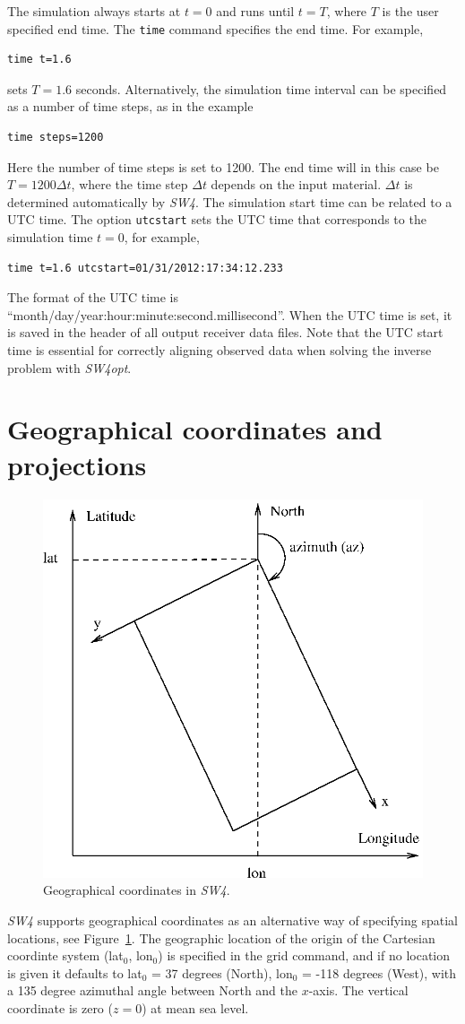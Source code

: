 \documentclass[11pt]{report}
\begin{document}
The simulation always starts at $t=0$ and runs until $t=T$, where $T$ is the user specified end
time.  The {\tt time} command specifies the end time. For example,
\begin{verbatim}
time t=1.6
\end{verbatim}
sets $T=1.6$ seconds. Alternatively, the simulation time interval can be specified as 
a number of time steps, as in the example
\begin{verbatim}
time steps=1200
\end{verbatim}
Here the number of time steps is set to 1200. The end time will in this case be $T=1200\Delta t$, where the
time step $\Delta t$ depends on the input material. $\Delta t$ is determined automatically by \emph{SW4}.
The simulation start time can be related to a UTC time. The option {\tt utcstart} sets the UTC time that
corresponds to the simulation time $t=0$, for example,
\begin{verbatim}
time t=1.6 utcstart=01/31/2012:17:34:12.233
\end{verbatim}
The format of the UTC time is ``month/day/year:hour:minute:second.millisecond''. When the UTC time
is set, it is saved in the header of all output receiver data files. Note that the UTC start time
is essential for correctly aligning observed data when solving the inverse problem with \emph{SW4opt}.

\section{Geographical coordinates and projections}
\begin{figure}
\begin{centering}
  \includegraphics[width=0.6\linewidth]{LatLonAz.ps}
  \caption{Geographical coordinates in \emph{SW4}.}
  \label{fig:geocoord}
\end{centering}
\end{figure}
\emph{SW4} supports geographical coordinates as an alternative way of specifying spatial locations,
see Figure~\ref{fig:geocoord}. The geographic location of the origin of the Cartesian coordinte
system (lat$_0$, lon$_0$) is specified in the grid command, and if no location is given it defaults
to lat$_0$ = 37 degrees (North), lon$_0$ = -118 degrees (West), with a 135 degree azimuthal angle
between North and the $x$-axis. The vertical coordinate is zero ($z=0$) at mean sea level. 
\end{document}
